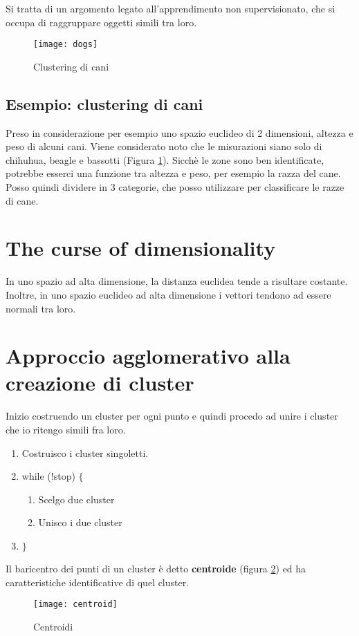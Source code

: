 \documentclass[\main/main.tex]{subfiles}
\begin{document}
Si tratta di un argomento legato all'apprendimento non supervisionato, che si occupa di raggruppare oggetti simili tra loro.

\begin{figure}[H]
  \centering
  \texttt{[image: dogs]}
  \caption{Clustering di cani}
  \label{dog}
\end{figure}

\subsection{Esempio: clustering di cani}
Preso in considerazione per esempio uno spazio euclideo di 2 dimensioni, altezza e peso di alcuni cani. Viene considerato noto che le misurazioni siano solo di chihuhua, beagle e bassotti (Figura \ref{dog}).
Sicchè le zone sono ben identificate, potrebbe esserci una funzione tra altezza e peso, per esempio la razza del cane. Posso quindi dividere in 3 categorie, che posso utilizzare per classificare le razze di cane.

\section{The curse of dimensionality}
In uno spazio ad alta dimensione, la distanza euclidea tende a risultare costante. Inoltre, in uno spazio euclideo ad alta dimensione i vettori tendono ad essere normali tra loro.

\section{Approccio agglomerativo alla creazione di cluster}
Inizio costruendo un cluster per ogni punto e quindi procedo ad unire i cluster che io ritengo simili fra loro.

\begin{enumerate}
  \item Costruisco i cluster singoletti.
  \item while (!stop) $\{$
        \begin{enumerate}
          \item Scelgo due cluster
          \item Unisco i due cluster
        \end{enumerate}
  \item $\}$
\end{enumerate}

\begin{definition}[Centroide]
  Il baricentro dei punti di un cluster è detto \textbf{centroide} (figura \ref{centroids}) ed ha caratteristiche identificative di quel cluster.
  \begin{figure}[H]
    \centering
    \texttt{[image: centroid]}
    \caption{Centroidi}
    \label{centroids}
  \end{figure}
\end{definition}
\end{document}
